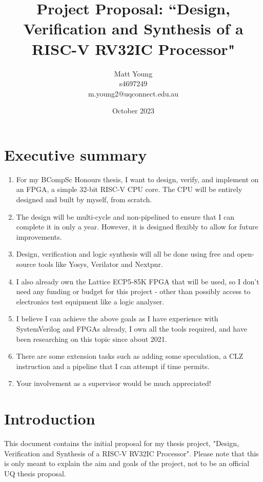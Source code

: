 \documentclass{article}
\title{\textbf{Project Proposal: ``Design, Verification and Synthesis of a RISC-V RV32IC Processor"}}
\author{Matt Young \\ s4697249 \\ m.young2@uqconnect.edu.au}
\date{October 2023}
\begin{document}
\maketitle

\tableofcontents

\clearpage

\section{Executive summary}
\begin{enumerate}
	\item For my BCompSc Honours thesis, I want to design, verify, and implement on an FPGA, a simple 32-bit 
		  RISC-V CPU core. The CPU will be entirely designed and built by myself, from scratch.
	\item The design will be multi-cycle and non-pipelined to ensure that I can complete it in only a year. However, it
		  is designed flexibly to allow for future improvements.
	\item Design, verification and logic synthesis will all be done using free and open-source tools
		like Yosys, Verilator and Nextpnr.
	\item I also already own the Lattice ECP5-85K FPGA that will be used, so I don't need any funding or budget for
	      this project - other than possibly access to electronics test equipment like a logic analyser.
	\item I believe I can achieve the above goals as I have experience with SystemVerilog and FPGAs already, I own all
	      the tools required, and have been researching on this topic since about 2021.
	\item There are some extension tasks such as adding some speculation, a CLZ instruction and a pipeline
		  that I can attempt if time permits.
	\item Your involvement as a supervisor would be much appreciated!
\end{enumerate}

\section{Introduction}
This document contains the initial proposal for my thesis project, "Design, Verification and Synthesis of a
RISC-V RV32IC Processor". Please note that this is only meant to explain the aim and goals of the project,
not to be an official UQ thesis proposal.
\end{document}
